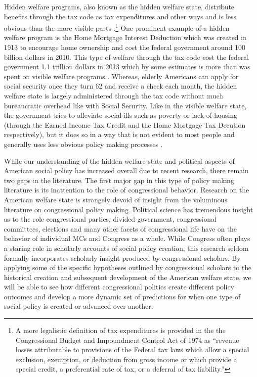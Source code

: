 \documentclass[12pt]{article}
\begin{document}
Hidden welfare programs, also known as the hidden welfare state, distribute benefits through the tax code as tax expenditures and other ways and is less obvious than the more visible parts \citep{howard1997}.\footnote{A more legalistic definition of tax expenditures is provided in the the Congressional Budget and Impoundment Control Act of 1974 as ``revenue losses attributable to provisions of the Federal tax laws which allow a special exclusion, exemption, or deduction from gross income or which provide a special credit, a preferential rate of tax, or a deferral of tax liability.''} One prominent example of a hidden welfare program is the Home Mortgage Interest Deduction which was created in 1913 to encourage home ownership and cost the federal government around 100 billion dollars in 2010. This type of welfare through the tax code cost the federal government 1.1 trillion dollars in 2013 which by some estimates is more than was spent on visible welfare programs \citep{omb2013}. Whereas, elderly Americans can apply for social security once they turn 62 and receive a check each month, the hidden welfare state is largely administered through the tax code without much bureaucratic overhead like with Social Security. Like in the visible welfare state, the government tries to alleviate social ills such as poverty or lack of housing (through the Earned Income Tax Credit and the Home Mortgage Tax Decution respectively), but it does so in a way that is not evident to most people and generally uses less obvious policy making processes \citep{mettler2011}. 

While our understanding of the hidden welfare state and political aspects of American social policy has increased overall due to recent research, there remain two gaps in the literature. The first major gap in this type of policy making literature is its inattention to the role of congressional behavior. Research on the American welfare state is strangely devoid of insight from the voluminous literature on congressional policy making. Political science has tremendous insight as to the role congressional parties, divided government, congressional committees, elections and many other facets of congressional life have on the behavior of individual MCs and Congress as a whole. While Congress often plays a staring role in scholarly accounts of social policy creation, this research seldom formally incorporates scholarly insight produced by congressional scholars. By applying some of the specific hypotheses outlined by congressional scholars to the historical creation and subsequent development of the American welfare state, we will be able to see how different congressional politics create different policy outcomes and develop a more dynamic set of predictions for when one type of social policy is created or advanced over another.	
\end{document}
